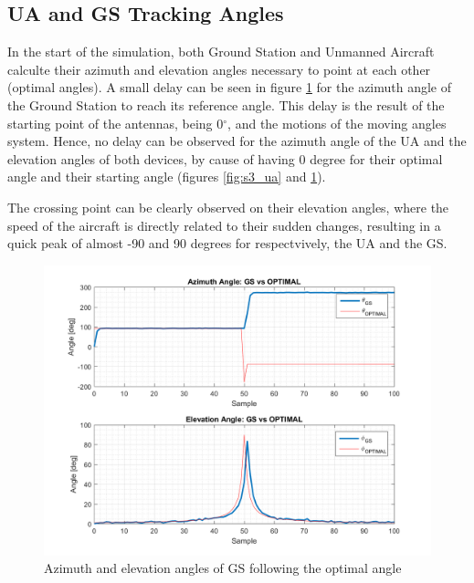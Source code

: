 \subsection*{UA and GS Tracking Angles}
In the start of the simulation, both Ground Station and Unmanned Aircraft calculte their azimuth and elevation angles necessary to point at each other (optimal angles). A small delay can be seen in figure \ref{fig:s3_gs} for the azimuth angle of the Ground Station to reach its reference angle. This delay is the result of the starting point of the antennas, being 0$^{\circ}$, and the motions of the moving angles system. Hence, no delay can be observed for the azimuth angle of the UA and the elevation angles of both devices, by cause of having 0 degree for their optimal angle and their starting angle (figures \ref{fig:s3_ua} and \ref{fig:s3_gs}).

The crossing point can be clearly observed on their elevation angles, where the speed of the aircraft is directly related to their sudden changes, resulting in a quick peak of almost -90 and 90 degrees for respectvively, the UA and the GS. 

\begin{figure}[H]
	\centering
	\includegraphics[scale=0.8]{figures/s3_gs.png}
	\caption{Azimuth and elevation angles of GS following the optimal angle}
	\label{fig:s3_gs}
\end{figure}

